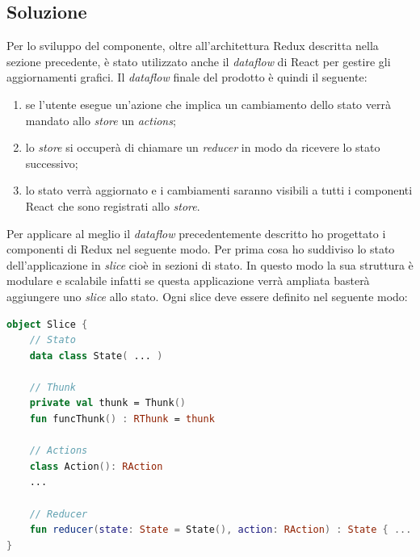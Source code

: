 \subsection{Soluzione}
Per lo sviluppo del componente, oltre all'architettura Redux descritta nella sezione precedente, è stato utilizzato anche il \emph{dataflow} di React per gestire gli aggiornamenti grafici. Il \emph{dataflow} finale del prodotto è quindi il seguente:
\begin{enumerate}
	\item se l'utente esegue un'azione che implica un cambiamento dello stato verrà mandato allo \emph{store} un \emph{actions};
	\item lo \emph{store} si occuperà di chiamare un \emph{reducer} in modo da ricevere lo stato successivo;
	\item lo stato verrà aggiornato e i cambiamenti saranno visibili a tutti i componenti React che sono registrati allo \emph{store}.
\end{enumerate}
Per applicare al meglio il \emph{dataflow} precedentemente descritto ho progettato i componenti di Redux nel seguente modo. Per prima cosa ho suddiviso lo stato dell'applicazione in \emph{slice} cioè in sezioni di stato. In questo modo la sua struttura è modulare e scalabile infatti se questa applicazione verrà ampliata basterà aggiungere uno \emph{slice} allo stato. Ogni slice deve essere definito nel seguente modo:
\begin{lstlisting}[caption={Esempio Slice}, label={lst:slice_state}, language=Kotlin]
object Slice {
	// Stato
	data class State( ... )
	
	// Thunk
	private val thunk = Thunk()
	fun funcThunk() : RThunk = thunk
	
	// Actions
	class Action(): RAction
	...
	
	// Reducer
	fun reducer(state: State = State(), action: RAction) : State { ... }
}
\end{lstlisting}

